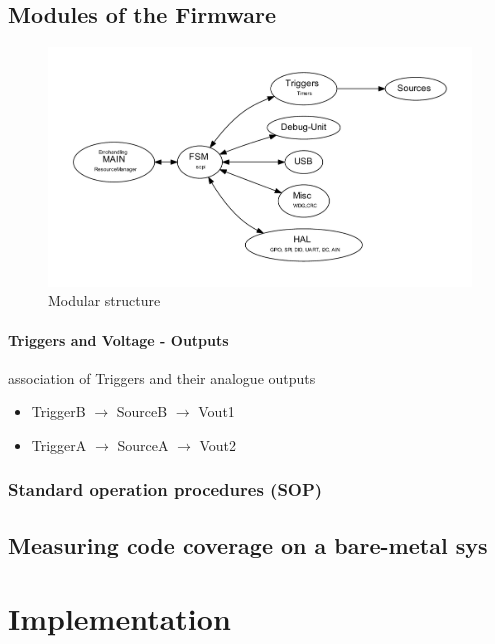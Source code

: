 \documentclass[master,english,smartquotes,apa]{hgbthesis}
\begin{document}
		\section{Modules of the Firmware}
		\begin{figure}[H]
			\center
			\includegraphics[width=\textwidth]{src/_FW-Modules.pdf}
			\caption{Modular structure}
			\label{fig:_FW-Modules}
		\end{figure}
	

		\subsubsection{Triggers and Voltage - Outputs}
		association of Triggers and their analogue outputs
		\begin{itemize}
			\item TriggerB $\rightarrow$ SourceB $\rightarrow$ Vout1
			\item TriggerA $\rightarrow$ SourceA $\rightarrow$ Vout2
		\end{itemize}
		\subsection{Standard operation procedures (SOP)}
		{	\scriptsize
			
		}

		\section{ Measuring code coverage on a bare-metal sys }
		
		
		
		
	\chapter{Implementation}
	\label{cha:Implementation}
\end{document}
